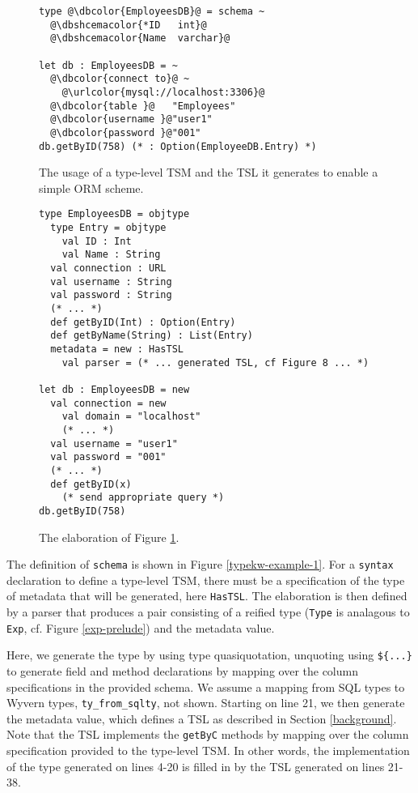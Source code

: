 \documentclass{sig-alternate}
\newcommand{\urlcolor}[1]{\textcolor[HTML]{FFCC33}{#1}}
\newcommand{\dbcolor}[1]{\textcolor[HTML]{FF47FF}{#1}}
\newcommand{\dbshcemacolor}[1]{\textcolor[HTML]{5AC3D1}{#1}}
\newcommand{\mycaption}[1]{\vspace{-4px}\caption{#1}\vspace{-2px}}
\begin{document}
\begin{figure}[t]
\begin{lstlisting}[style=wyvern]
type @\dbcolor{EmployeesDB}@ = schema ~
  @\dbshcemacolor{*ID   int}@
  @\dbshcemacolor{Name  varchar}@

let db : EmployeesDB = ~
  @\dbcolor{connect to}@ ~
    @\urlcolor{mysql://localhost:3306}@
  @\dbcolor{table }@   "Employees"
  @\dbcolor{username }@"user1"
  @\dbcolor{password }@"001"
db.getByID(758) (* : Option(EmployeeDB.Entry) *)
\end{lstlisting}
\mycaption{The usage of a type-level TSM and the TSL it generates to enable a simple ORM scheme.}
\label{f-tykwexample}
\end{figure}

\begin{figure}[t]
\begin{lstlisting}[style=wyvern]
type EmployeesDB = objtype
  type Entry = objtype
    val ID : Int
    val Name : String 
  val connection : URL
  val username : String
  val password : String
  (* ... *)
  def getByID(Int) : Option(Entry)
  def getByName(String) : List(Entry)
  metadata = new : HasTSL
    val parser = (* ... generated TSL, cf Figure 8 ... *)

let db : EmployeesDB = new
  val connection = new
    val domain = "localhost"
    (* ... *)
  val username = "user1"
  val password = "001"
  (* ... *)
  def getByID(x)
    (* send appropriate query *)
db.getByID(758)
\end{lstlisting}
\mycaption{The elaboration of Figure \ref{f-tykwexample}.}
\label{typekw-example-2}
\end{figure}

The definition of \verb|schema| is shown in Figure \ref{typekw-example-1}. For a \verb|syntax| declaration to define a type-level TSM, there must be a specification of the type of metadata that will be generated, here \verb|HasTSL|. The elaboration is then defined by a parser that produces a pair consisting of a reified type (\verb|Type| is analagous to \verb|Exp|, cf. Figure \ref{exp-prelude}) and the metadata value. 

Here, we generate the type by using type quasiquotation, unquoting using \verb|${...}| to generate  field and method declarations by mapping over the column specifications in the provided schema. We assume a mapping from SQL types to Wyvern types, \verb|ty_from_sqlty|, not shown. Starting on line 21, we then generate the metadata value, which defines a TSL as described in Section \ref{background}. Note  that the TSL implements the \verb|getByC| methods by mapping over the column specification provided to the type-level TSM. In other words, the implementation of the type generated on lines 4-20 is filled in by the TSL generated on lines 21-38.
\end{document}
